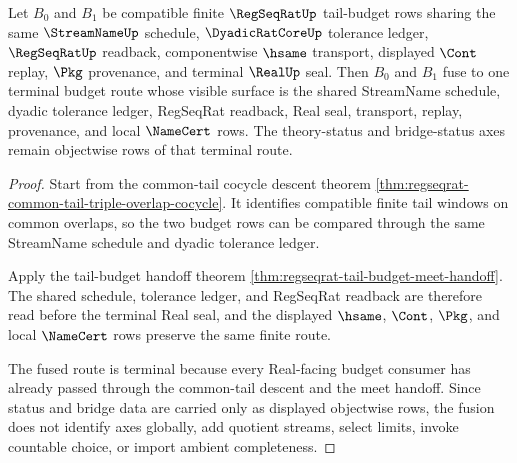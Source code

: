 \begin{theorem}
\label{thm:regseqrat-tail-budget-fusion}
Let $B_0$ and $B_1$ be compatible finite $\RegSeqRatUp$ tail-budget rows sharing the same $\StreamNameUp$ schedule, $\DyadicRatCoreUp$ tolerance ledger, $\RegSeqRatUp$ readback, componentwise $\hsame$ transport, displayed $\Cont$ replay, $\Pkg$ provenance, and terminal $\RealUp$ seal. Then $B_0$ and $B_1$ fuse to one terminal budget route whose visible surface is the shared StreamName schedule, dyadic tolerance ledger, RegSeqRat readback, Real seal, transport, replay, provenance, and local $\NameCert$ rows. The theory-status and bridge-status axes remain objectwise rows of that terminal route.
\end{theorem}
\begin{proof}
Start from the common-tail cocycle descent theorem \autoref{thm:regseqrat-common-tail-triple-overlap-cocycle}. It identifies compatible finite tail windows on common overlaps, so the two budget rows can be compared through the same StreamName schedule and dyadic tolerance ledger.

Apply the tail-budget handoff theorem \autoref{thm:regseqrat-tail-budget-meet-handoff}. The shared schedule, tolerance ledger, and RegSeqRat readback are therefore read before the terminal Real seal, and the displayed $\hsame$, $\Cont$, $\Pkg$, and local $\NameCert$ rows preserve the same finite route.

The fused route is terminal because every Real-facing budget consumer has already passed through the common-tail descent and the meet handoff. Since status and bridge data are carried only as displayed objectwise rows, the fusion does not identify axes globally, add quotient streams, select limits, invoke countable choice, or import ambient completeness.
\end{proof}
